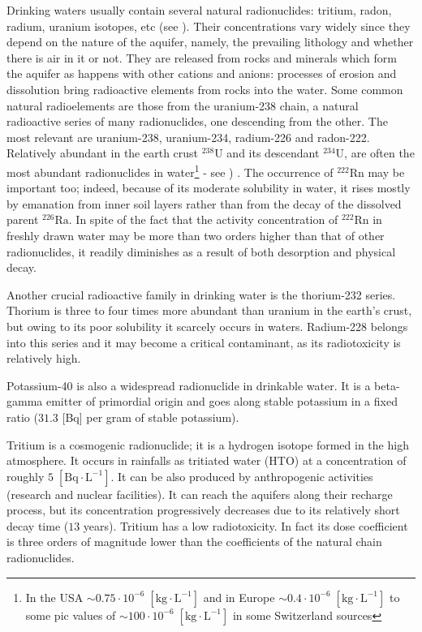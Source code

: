 	Drinking waters usually contain several natural radionuclides: tritium, radon, radium, uranium isotopes, etc (see \cite{forte2015validation}). Their concentrations vary widely since they depend on the nature of the aquifer, namely, the prevailing lithology and whether there is air in it or not. They are released from rocks and minerals which form the aquifer as happens with other cations and anions: processes of erosion and dissolution bring radioactive elements from rocks into the water. Some common natural radioelements are those from the uranium-238 chain, a natural radioactive series of many radionuclides, one descending from the other. The most relevant are uranium-238, uranium-234, radium-226 and radon-222. Relatively abundant in the earth crust $^{238}\mathrm{U}$ and its descendant $^{234}\mathrm{U}$, are often the most abundant radionuclides in water\footnote{In the USA $\sim 0.75 \cdot 10^{-6}\; [\text{kg}\cdot\text{L}^{-1}]$ and in Europe $\sim 0.4 \cdot 10^{-6}\; [\text{kg}\cdot\text{L}^{-1}]$ to some pic values of $\sim 100 \cdot 10^{-6}\; [\text{kg}\cdot\text{L}^{-1}]$ in some Switzerland sources} - see \cite{cothern1983occurrence}) . The occurrence of $^{222}\mathrm{Rn}$ may be important too; indeed, because of its moderate solubility in water, it rises mostly by emanation from inner soil layers rather than from the decay of the dissolved parent $^{226}\mathrm{Ra}$. In spite of the fact that the activity concentration of $^{222}\mathrm{Rn}$ in freshly drawn water may be more than two orders higher than that of other radionuclides, it readily diminishes as a result of both desorption and physical decay. 
	
	Another crucial radioactive family in drinking water is the thorium-232 series. Thorium is three to four times more abundant than uranium in the earth's crust, but owing to its poor solubility it scarcely occurs in waters. Radium-228 belongs into this series and it may become a critical contaminant, as its radiotoxicity is relatively high.

	Potassium-40 is also a widespread radionuclide in drinkable water. It is a beta-gamma emitter of primordial origin and goes along stable potassium in a fixed ratio ($31.3$ [Bq] per gram of stable potassium).

	Tritium is a cosmogenic radionuclide; it is a hydrogen isotope formed in the high atmosphere. It occurs in rainfalls as tritiated water (HTO) at a concentration of roughly $5\; [\text{Bq}\cdot\text{L}^{-1}]$. It can be also produced by anthropogenic activities (research and nuclear facilities). It can reach the aquifers along their recharge process, but its concentration progressively decreases due to its relatively short decay time ($13$ years). Tritium has a low radiotoxicity. In fact its dose coefficient is three orders of magnitude lower than the coefficients of the natural chain radionuclides.
	
